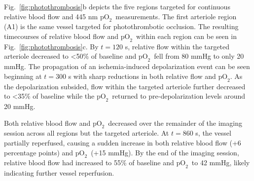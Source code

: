 \documentclass[12pt]{spieman}  %
\newcommand{\pO}{\ensuremath{\text{pO}_2}} 	            %
\begin{document}
\begin{spacing}{2}
Fig.~\ref{fig:photothrombosis}b depicts the five regions targeted for continuous relative blood flow and 445 nm \pO\ measurements. The first arteriole region (A1) is the same vessel targeted for photothrombotic occlusion. The resulting timecourses of relative blood flow and \pO\ within each region can be seen in Fig.~\ref{fig:photothrombosis}c. By $t = 120$ s, relative flow within the targeted arteriole decreased to \textless50\% of baseline and \pO\ fell from 80 mmHg to only 20 mmHg. The propagation of an ischemia-induced depolarization event \cite{Shin:2006dc,Dreier:2011gz} can be seen beginning at $t = 300$ s with sharp reductions in both relative flow and \pO. As the depolarization subsided, flow within the targeted arteriole further decreased to \textless35\% of baseline while the \pO\ returned to pre-depolarization levels around 20 mmHg.

Both relative blood flow and \pO\ decreased over the remainder of the imaging session across all regions but the targeted arteriole. At $t = 860$ s, the vessel partially reperfused, causing a sudden increase in both relative blood flow (+6 percentage points) and \pO\ (+15 mmHg). By the end of the imaging session, relative blood flow had increased to 55\% of baseline and \pO\ to 42 mmHg, likely indicating further vessel reperfusion.


\end{spacing}
\end{document}
